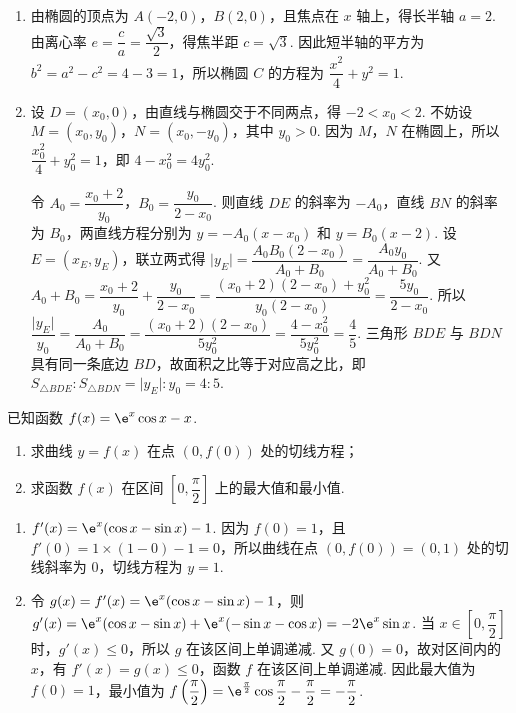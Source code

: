 \begin{solution}
\begin{enumerate}
\item 由椭圆的顶点为 \(A(-2,0)\)，\(B(2,0)\)，且焦点在 \(x\) 轴上，得长半轴 \(a=2\). 由离心率 \(e=\dfrac ca=\dfrac{\sqrt3}{2}\)，得焦半距 \(c=\sqrt3\). 因此短半轴的平方为 \(b^2=a^2-c^2=4-3=1\)，所以椭圆 \(C\) 的方程为 \(\dfrac{x^2}{4}+y^2=1\).
\item 设 \(D=(x_0,0)\)，由直线与椭圆交于不同两点，得 \(-2<x_0<2\). 不妨设 \(M=(x_0,y_0)\)，\(N=(x_0,-y_0)\)，其中 \(y_0>0\). 因为 \(M\)，\(N\) 在椭圆上，所以
\(\dfrac{x_0^2}{4}+y_0^2=1\)，即 \(4-x_0^2=4y_0^2\).

令 \(A_0=\dfrac{x_0+2}{y_0}\)，\(B_0=\dfrac{y_0}{2-x_0}\). 则直线 \(DE\) 的斜率为 \(-A_0\)，直线 \(BN\) 的斜率为 \(B_0\)，两直线方程分别为 \(y=-A_0(x-x_0)\) 和 \(y=B_0(x-2)\). 设 \(E=(x_E,y_E)\)，联立两式得
\(\lvert y_E\rvert=\dfrac{A_0B_0(2-x_0)}{A_0+B_0}=\dfrac{A_0y_0}{A_0+B_0}\).
又
\(A_0+B_0=\dfrac{x_0+2}{y_0}+\dfrac{y_0}{2-x_0}=\dfrac{(x_0+2)(2-x_0)+y_0^2}{y_0(2-x_0)}=\dfrac{5y_0}{2-x_0}\).
所以
\(\dfrac{\lvert y_E\rvert}{y_0}=\dfrac{A_0}{A_0+B_0}=\dfrac{(x_0+2)(2-x_0)}{5y_0^2}=\dfrac{4-x_0^2}{5y_0^2}=\dfrac45\).
三角形 \(BDE\) 与 \(BDN\) 具有同一条底边 \(BD\)，故面积之比等于对应高之比，即
\(S_{\triangle BDE}:S_{\triangle BDN}=\lvert y_E\rvert:y_0=4:5\).
\end{enumerate}
\end{solution}

\begin{problem}

已知函数 \(f(x)=\e^x\cos x-x\).

\begin{enumerate}
\item 求曲线 \(y=f(x)\) 在点 \((0,f(0))\) 处的切线方程；
\item 求函数 \(f(x)\) 在区间 \(\left[0,\dfrac\pi2\right]\) 上的最大值和最小值.
\end{enumerate}
\end{problem}

\begin{solution}
\begin{enumerate}
\item \(f'(x)=\e^x(\cos x-\sin x)-1\). 因为 \(f(0)=1\)，且 \(f'(0)=1\times(1-0)-1=0\)，所以曲线在点 \((0,f(0))=(0,1)\) 处的切线斜率为 \(0\)，切线方程为 \(y=1\).
\item 令 \(g(x)=f'(x)=\e^x(\cos x-\sin x)-1\)，则
\(g'(x)=\e^x(\cos x-\sin x)+\e^x(-\sin x-\cos x)=-2\e^x\sin x\).
当 \(x\in\left[0,\dfrac\pi2\right]\) 时，\(g'(x)\le0\)，所以 \(g\) 在该区间上单调递减. 又 \(g(0)=0\)，故对区间内的 \(x\)，有 \(f'(x)=g(x)\le0\)，函数 \(f\) 在该区间上单调递减.
因此最大值为 \(f(0)=1\)，最小值为 \(f\left(\dfrac\pi2\right)=\e^{\frac\pi2}\cos\dfrac\pi2-\dfrac\pi2=-\dfrac\pi2\).
\end{enumerate}
\end{solution}
